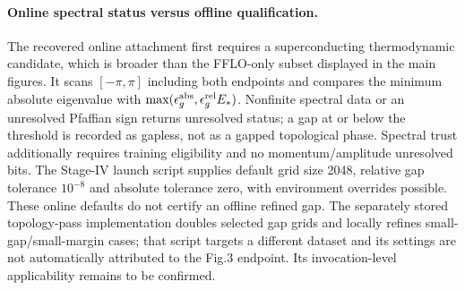 \paragraph{Online spectral status versus offline qualification.}
The recovered online attachment first requires a superconducting thermodynamic candidate, which is broader than the FFLO-only subset displayed in the main figures. It scans $[-\pi,\pi]$ including both endpoints and compares the minimum absolute eigenvalue with $\max(\epsilon_g^{\rm abs},\epsilon_g^{\rm rel}E_*)$. Nonfinite spectral data or an unresolved Pfaffian sign returns unresolved status; a gap at or below the threshold is recorded as gapless, not as a gapped topological phase. Spectral trust additionally requires training eligibility and no momentum/amplitude unresolved bits. The Stage-IV launch script supplies default grid size 2048, relative gap tolerance $10^{-8}$ and absolute tolerance zero, with environment overrides possible. These online defaults do not certify an offline refined gap. The separately stored topology-pass implementation doubles selected gap grids and locally refines small-gap/small-margin cases; that script targets a different dataset and its settings are not automatically attributed to the Fig.3 endpoint. Its invocation-level applicability remains to be confirmed.
